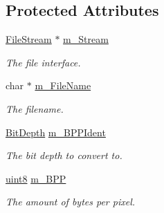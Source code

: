 \subsection*{Protected Attributes}
\begin{DoxyCompactItemize}
\item 
\hypertarget{classtil_1_1_image_a99fcde28d6287cbf55b1a6307788f5c6}{
\hyperlink{classtil_1_1_file_stream}{FileStream} $\ast$ \hyperlink{classtil_1_1_image_a99fcde28d6287cbf55b1a6307788f5c6}{m\_\-Stream}}
\label{classtil_1_1_image_a99fcde28d6287cbf55b1a6307788f5c6}

\begin{DoxyCompactList}\small\item\em The file interface. \item\end{DoxyCompactList}\item 
\hypertarget{classtil_1_1_image_ac995efac9fe1641e276452bdb90fbddd}{
char $\ast$ \hyperlink{classtil_1_1_image_ac995efac9fe1641e276452bdb90fbddd}{m\_\-FileName}}
\label{classtil_1_1_image_ac995efac9fe1641e276452bdb90fbddd}

\begin{DoxyCompactList}\small\item\em The filename. \item\end{DoxyCompactList}\item 
\hypertarget{classtil_1_1_image_a200eeebc45a71c0935aee4e5afded433}{
\hyperlink{classtil_1_1_image_a621d337ba744563ed6bde962e08dfbc8}{BitDepth} \hyperlink{classtil_1_1_image_a200eeebc45a71c0935aee4e5afded433}{m\_\-BPPIdent}}
\label{classtil_1_1_image_a200eeebc45a71c0935aee4e5afded433}

\begin{DoxyCompactList}\small\item\em The bit depth to convert to. \item\end{DoxyCompactList}\item 
\hypertarget{classtil_1_1_image_af3aa350823454079c3bf84f30bcfd0c5}{
\hyperlink{namespacetil_a7a75b0e7e2cd3f19ea51c8c02fd242f8}{uint8} \hyperlink{classtil_1_1_image_af3aa350823454079c3bf84f30bcfd0c5}{m\_\-BPP}}
\label{classtil_1_1_image_af3aa350823454079c3bf84f30bcfd0c5}

\begin{DoxyCompactList}\small\item\em The amount of bytes per pixel. \item\end{DoxyCompactList}\end{DoxyCompactItemize}



